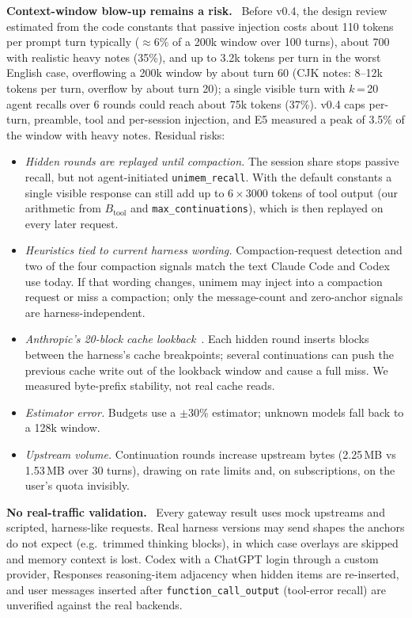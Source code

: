 \documentclass[10pt,twocolumn]{article}
\newcommand{\sys}{\textsf{unimem}}
\newcommand{\code}[1]{\texttt{\small #1}}
\newcommand{\para}[1]{\smallskip\noindent\textbf{#1}\ }
\begin{document}
\para{Context-window blow-up remains a risk.} Before v0.4, the design review estimated from the code constants that
passive injection costs about 110 tokens per prompt turn typically ($\approx$6\% of a 200k window over 100 turns), about 700
with realistic heavy notes (35\%), and up to 3.2k tokens per turn in the worst English case, overflowing a 200k window by
about turn 60 (CJK notes: 8--12k tokens per turn, overflow by about turn 20); a single visible turn with $k$\,=\,20 agent
recalls over 6 rounds could reach about 75k tokens (37\%). v0.4 caps per-turn, preamble, tool and per-session injection,
and E5 measured a peak of 3.5\% of the window with heavy notes. Residual risks:
\begin{itemize}
\item \emph{Hidden rounds are replayed until compaction.} The session share stops passive recall, but not agent-initiated
  \code{unimem\_recall}. With the default constants a single visible response can still add up to $6\times3000$ tokens of tool
  output (our arithmetic from $B_{\text{tool}}$ and \code{max\_continuations}), which is then replayed on every later request.
\item \emph{Heuristics tied to current harness wording.} Compaction-request detection and two of the four compaction signals
  match the text Claude Code and Codex use today. If that wording changes, \sys{} may inject into a compaction request or miss
  a compaction; only the message-count and zero-anchor signals are harness-independent.
\item \emph{Anthropic's 20-block cache lookback}~\cite{promptcaching}. Each hidden round inserts blocks between the harness's
  cache breakpoints; several continuations can push the previous cache write out of the lookback window and cause a full
  miss. We measured byte-prefix stability, not real cache reads.
\item \emph{Estimator error.} Budgets use a $\pm$30\% estimator; unknown models fall back to a 128k window.
\item \emph{Upstream volume.} Continuation rounds increase upstream bytes (2.25\,MB vs 1.53\,MB over 30 turns), drawing on
  rate limits and, on subscriptions, on the user's quota invisibly.
\end{itemize}

\para{No real-traffic validation.} Every gateway result uses mock upstreams and scripted, harness-like requests. Real harness
versions may send shapes the anchors do not expect (e.g.\ trimmed thinking blocks), in which case overlays are skipped and
memory context is lost. Codex with a ChatGPT login through a custom provider, Responses reasoning-item adjacency when hidden
items are re-inserted, and user messages inserted after \code{function\_call\_output} (tool-error recall) are unverified
against the real backends.
\end{document}
